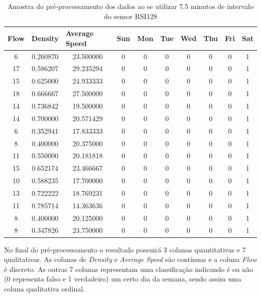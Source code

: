 \begin{table}[h]
    \begin{tabular}{cccccccccc}
    \toprule
    \multicolumn{1}{l}{\textbf{Flow}} & \multicolumn{1}{l}{\textbf{Density}} & \multicolumn{1}{l}{\textbf{Average Speed}} & \multicolumn{1}{l}{\textbf{Sun}} &
    \multicolumn{1}{l}{\textbf{Mon}} & \multicolumn{1}{l}{\textbf{Tue}} & \multicolumn{1}{l}{\textbf{Wed}} & \multicolumn{1}{l}{\textbf{Thu}} &
    \multicolumn{1}{l}{\textbf{Fri}} &
    \multicolumn{1}{l}{\textbf{Sat}} \\
    \midrule
     6 & 0.260870 & 23.500000 & 0 & 0 & 0 & 0 & 0 & 0 & 1 \\
    \midrule
    17 & 0.586207 & 29.235294 & 0 & 0 & 0 & 0 & 0 & 0 & 1 \\
    \midrule
    15 & 0.625000 & 24.933333 & 0 & 0 & 0 & 0 & 0 & 0 & 1 \\
    \midrule
    18 & 0.666667 & 27.500000 & 0 & 0 & 0 & 0 & 0 & 0 & 1 \\
    \midrule
    14 & 0.736842 & 19.500000 & 0 & 0 & 0 & 0 & 0 & 0 & 1 \\
    \midrule
    14 & 0.700000 & 20.571429 & 0 & 0 & 0 & 0 & 0 & 0 & 1 \\
    \midrule
     6 & 0.352941 & 17.833333 & 0 & 0 & 0 & 0 & 0 & 0 & 1 \\
    \midrule
     8 & 0.400000 & 20.375000 & 0 & 0 & 0 & 0 & 0 & 0 & 1 \\
    \midrule
    11 & 0.550000 & 20.181818 & 0 & 0 & 0 & 0 & 0 & 0 & 1 \\
    \midrule
    15 & 0.652174 & 23.466667 & 0 & 0 & 0 & 0 & 0 & 0 & 1 \\
    \midrule
    10 & 0.588235 & 17.700000 & 0 & 0 & 0 & 0 & 0 & 0 & 1 \\
    \midrule
    13 & 0.722222 & 18.769231 & 0 & 0 & 0 & 0 & 0 & 0 & 1 \\
    \midrule
    11 & 0.785714 & 14.363636 & 0 & 0 & 0 & 0 & 0 & 0 & 1 \\
    \midrule
     8 & 0.400000 & 20.125000 & 0 & 0 & 0 & 0 & 0 & 0 & 1 \\
    \midrule
     8 & 0.347826 & 23.750000 & 0 & 0 & 0 & 0 & 0 & 0 & 1 \\
    \bottomrule
    \end{tabular}
    \label{table:data_pre}
    \caption{Amostra do pré-processamento dos dados ao se utilizar 7.5 minutos de intervalo do sensor RSI128}
\end{table}

No final do pré-processamento o resultado possuirá 3 colunas quantitativas e 7 qualitativas. As colunas de \textit{Density} e \textit{Average Speed} são contínuas e a coluna \textit{Flow} é discreto. As outras 7 colunas representam uma classificação indicando é ou não (0 representa falso e 1 verdadeiro) um certo dia da semana, sendo assim uma coluna qualitativa ordinal.

